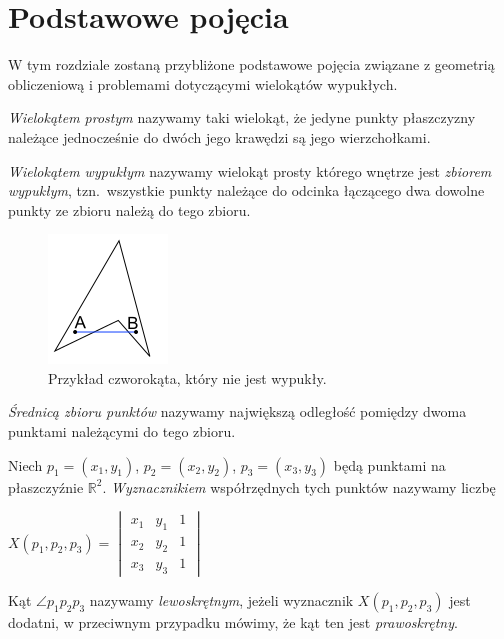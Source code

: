 \chapter{Podstawowe pojęcia}\label{chap:pojecia}
W tym rozdziale zostaną przybliżone podstawowe pojęcia związane
z geometrią obliczeniową i problemami dotyczącymi wielokątów
wypukłych.

\begin{definicja}
  \emph{Wielokątem prostym} nazywamy taki wielokąt, że jedyne punkty
  płaszczyzny należące jednocześnie do dwóch jego krawędzi są jego
  wierzchołkami.
\end{definicja}

\begin{definicja}
  \emph{Wielokątem wypukłym} nazywamy wielokąt prosty którego wnętrze
  jest \emph{zbiorem wypukłym}, tzn.\ wszystkie punkty należące do
  odcinka łączącego dwa dowolne punkty ze zbioru należą do tego
  zbioru.
\end{definicja}


\begin{figure}[htb]
  \centering
  \includegraphics{img/nonconvex}
  \caption{Przykład czworokąta, który nie jest wypukły.}
\end{figure}

\begin{definicja}
  \emph{Średnicą zbioru punktów} nazywamy największą odległość
  pomiędzy dwoma punktami należącymi do tego zbioru.
\end{definicja}

\begin{definicja}
  Niech $p_{1}=(x_{1},y_{1})$, $p_{2}=(x_{2},y_{2})$,
  $p_{3}=(x_{3},y_{3})$ będą punktami na płaszczyźnie
  $\mathbb{R}^2$. \emph{Wyznacznikiem} współrzędnych tych punktów
  nazywamy liczbę

  \begin{center}
    \begin{math}
      X(p_1, p_2, p_3) =
      \begin{vmatrix}
        x_1 & y_1 & 1 \\
        x_2 & y_2 & 1 \\
        x_3 & y_3 & 1
      \end{vmatrix}
    \end{math}
  \end{center}

  Kąt $\angle p_{1}p_{2}p_{3}$ nazywamy \emph{lewoskrętnym}, jeżeli
  wyznacznik $X(p_1, p_2, p_3)$ jest dodatni, w przeciwnym przypadku
  mówimy, że kąt ten jest \emph{prawoskrętny}.
\end{definicja}

